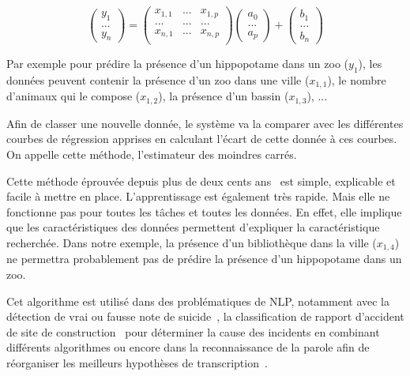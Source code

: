 \begin{equation}
  \begin{pmatrix} y_1\\ ...\\ y_n \end{pmatrix}
=
\begin{pmatrix} x_{1,1}& ...  & x_{1,p}  \\ ...& ... & ... \\ x_{n,1}& ... & x_{n,p}  \\ \end{pmatrix}
\begin{pmatrix} a_0\\ ...\\ a_p\end{pmatrix}
+
\begin{pmatrix} b_1\\ ...\\ b_n \end{pmatrix}
  \label{eq:regression_lineaire}
\end{equation}

Par exemple pour prédire la présence d'un hippopotame dans un zoo ($y_1$), les données peuvent contenir la présence d'un zoo dans une ville ($x_{1,1}$), le nombre d'animaux qui le compose ($x_{1,2}$), la présence d'un bassin ($x_{1,3}$), ...

Afin de classer une nouvelle donnée, le système va la comparer avec les différentes courbes de régression apprises en calculant l'écart de cette donnée à ces courbes. On appelle cette méthode, l'estimateur des moindres carrés.

Cette méthode éprouvée depuis plus de deux cents ans~\cite{Gauss1809,Legendre1805,Adrain1808} est simple, explicable et facile à mettre en place.  L'apprentissage est également très rapide. Mais elle ne fonctionne pas pour toutes les tâches et toutes les données. En effet, elle implique que les caractéristiques des données permettent d'expliquer la caractéristique recherchée. Dans notre exemple, la présence d'un bibliothèque dans la ville ($x_{1,4}$) ne permettra probablement pas de prédire la présence d'un hippopotame dans un zoo.

Cet algorithme est utilisé dans des problématiques de NLP, notamment avec la détection de vrai ou fausse note de suicide~\cite{Pestian2010}, la classification de rapport d'accident de site de construction~\cite{Zhang2019} pour déterminer la cause des incidents en combinant différents algorithmes ou encore dans la reconnaissance de la parole afin de réorganiser les meilleurs hypothèses de transcription~\cite{Chotimongkol2001}.

